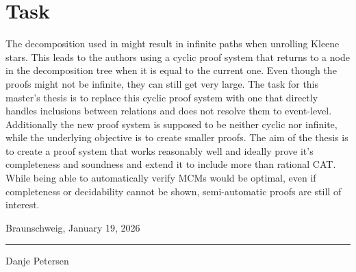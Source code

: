 \documentclass[a4paper,11pt,twoside, english]{article}
\begin{document}
\section{Task} \label{sec:task}
The decomposition used in \cite{GruMey25} might result in infinite paths when unrolling Kleene stars. This leads to the authors using a cyclic proof system that returns to a node in the decomposition tree when it is equal to the current one. Even though the proofs might not be infinite, they can still get very large. 
The task for this master's thesis is to replace this cyclic proof system with one that directly handles inclusions between relations and does not resolve them to event-level. Additionally the new proof system is supposed to be neither cyclic nor infinite, while the underlying objective is to create smaller proofs.
The aim of the thesis is to create a proof system that works reasonably well and ideally prove it's completeness and soundness and extend it to include more than rational CAT.
While being able to automatically verify MCMs would be optimal, even if completeness or decidability cannot be shown, semi-automatic proofs are still of interest. \\

\vfill


\noindent Braunschweig, January 19, 2026 \hfill\rule{5cm}{.4pt}\par
\noindent \hfill Danje Petersen
\vspace*{3cm}
\pagebreak
\renewcommand{\bibfont}{\footnotesize}
\printbibliography
\end{document}

